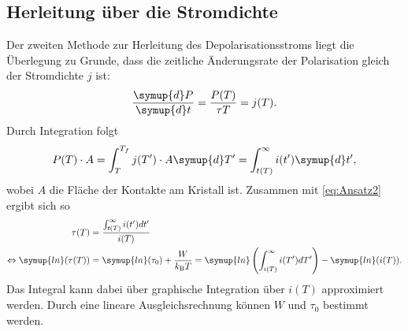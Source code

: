 \subsection{Herleitung über die Stromdichte}
Der zweiten Methode zur Herleitung des Depolarisationsstroms liegt die Überlegung zu Grunde, dass die zeitliche Änderungsrate der Polarisation gleich der Stromdichte $j$ ist:
\begin{equation}
    \label{eq:Ansatz2}
    \frac{\symup{d}P}{\symup{d}t} = \frac{P(T)}{\tau{T}} = j(T).
\end{equation}
Durch Integration folgt 
\begin{equation*}
    P(T) \cdot A = \int_T^{T_f} j(T') \cdot A \symup{d}T' = \int_{t(T)}^\infty i(t') \symup{d}t',
\end{equation*}
wobei $A$ die Fläche der Kontakte am Kristall ist. Zusammen mit \autoref{eq:Ansatz2} ergibt sich so 
\begin{align}
    \tau(T) &= \frac{\int_{t(T)}^{\infty} i(t') dt'}{i(T)} \nonumber \\
    \Leftrightarrow \symup{ln}(\tau(T)) &= \symup{ln}(\tau_0) + \frac{W}{k_\text{B}T} = \symup{ln}\left(\int_{i(T)}^\infty i(T')dT' \right) - \symup{ln}(i(T)).
    \label{eq:W_tau0}
\end{align}
Das Integral kann dabei über graphische Integration über $i(T)$ approximiert werden. Durch eine lineare Ausgleichsrechnung können $W$ und $\tau_0$ bestimmt werden.
